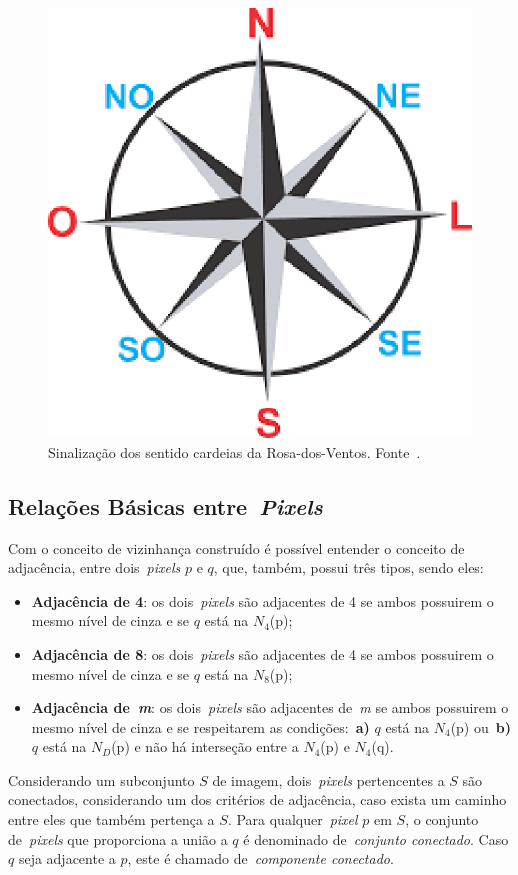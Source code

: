 \documentclass[conference]{Trabalho_2}
\begin{document}
\begin{figure}[!t]
  \centering
  \includegraphics[width = 4.5 cm]{rosadosventos}
  \caption{Sinaliza\c{c}\~ao dos sentido cardeias da Rosa-dos-Ventos. Fonte~\cite{rosadosventos}.}
  \label{fig:rosadosventos}
\end{figure}

\subsection{Rela\c{c}\~oes B\'asicas entre~\textit{Pixels}}
Com o conceito de vizinhan\c{c}a constru\'ido \'e poss\'ivel entender o conceito de adjac\^encia, entre dois~\textit{pixels} $p$ e $q$, que, tamb\'em, possui tr\^es tipos, sendo eles:

\begin{itemize}
 \item \textbf{Adjac\^encia de 4}: os dois~\textit{pixels} s\~ao adjacentes de 4 se ambos possuirem o mesmo n\'ivel de cinza e se $q$ est\'a na $N_4$(p);
 \item \textbf{Adjac\^encia de 8}: os dois~\textit{pixels} s\~ao adjacentes de 4 se ambos possuirem o mesmo n\'ivel de cinza e se $q$ est\'a na $N_8$(p);
 \item \textbf{Adjac\^encia de~\textit{m}}: os dois~\textit{pixels} s\~ao adjacentes de~\textit{m} se ambos possuirem o mesmo n\'ivel de cinza e se respeitarem as condi\c{c}\~oes:~\textbf{a)} $q$ est\'a na $N_4$(p) ou~\textbf{b)} $q$ est\'a na $N_D$(p) e n\~ao h\'a interse\c{c}\~ao entre a $N_4$(p) e $N_4$(q). 
\end{itemize}

Considerando um subconjunto $S$ de imagem, dois~\textit{pixels} pertencentes a $S$ s\~ao conectados, considerando um dos crit\'erios de adjac\^encia, caso exista um caminho entre eles que tamb\'em perten\c{c}a a $S$. Para qualquer~\textit{pixel} $p$ em $S$, o conjunto de~\textit{pixels} que proporciona a uni\~ao a $q$ \'e denominado de~\textit{conjunto conectado}. Caso $q$ seja adjacente a $p$, este \'e chamado de~\textit{componente conectado}.
\end{document}
